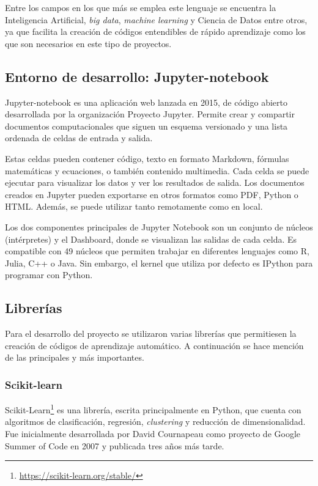 \documentclass[a4paper, 12pt]{book}
\begin{document}
Entre los campos en los que más se emplea este lenguaje se encuentra la Inteligencia Artificial, \textit{big data}, \textit{machine learning} y Ciencia de Datos entre otros, ya que facilita la creación de códigos entendibles de rápido aprendizaje como los que son necesarios en este tipo de proyectos.

\subsection{Entorno de desarrollo: Jupyter-notebook}
\label{subsec:entorno_de_desarrollo}

Jupyter-notebook es una aplicación web lanzada en 2015, de código abierto desarrollada por la organización Proyecto Jupyter. Permite crear y compartir documentos computacionales que siguen un esquema versionado y una lista ordenada de celdas de entrada y salida.

Estas celdas pueden contener código, texto en formato Markdown, fórmulas matemáticas y ecuaciones, o también contenido multimedia. Cada celda se puede ejecutar para visualizar los datos y ver los resultados de salida. Los documentos creados en Jupyter pueden exportarse en otros formatos como PDF, Python o HTML. Además, se puede utilizar tanto remotamente como en local.

Los dos componentes principales de Jupyter Notebook son un conjunto de núcleos (intérpretes) y el Dashboard, donde se visualizan las salidas de cada celda. Es compatible con 49 núcleos que permiten trabajar en diferentes lenguajes como R, Julia, C++ o Java. Sin embargo, el kernel que utiliza por defecto es IPython para programar con Python. 

\subsection{Librerías}
\label{subsec:Librerías}
Para el desarrollo del proyecto se utilizaron varias librerías que permitiesen la creación de códigos de aprendizaje automático. A continuación se hace mención de las principales y más importantes.

\subsubsection{Scikit-learn}
\label{subsubsec:Scikit-learn}
Scikit-Learn\footnote{\url{https://scikit-learn.org/stable/}} es una librería, escrita principalmente en Python, que cuenta con algoritmos de clasificación, regresión, \textit{clustering} y reducción de dimensionalidad. Fue inicialmente desarrollada por David Cournapeau como proyecto de Google Summer of Code en 2007 y publicada tres años más tarde.
\end{document}
